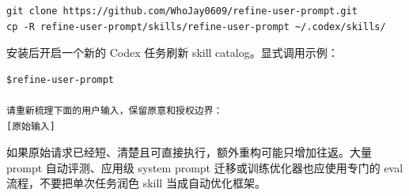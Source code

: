 \documentclass[UTF8,a4paper,11pt,fontset=none]{ctexart}
\begin{document}
\begin{lstlisting}
git clone https://github.com/WhoJay0609/refine-user-prompt.git
cp -R refine-user-prompt/skills/refine-user-prompt ~/.codex/skills/
\end{lstlisting}

安装后开启一个新的 Codex 任务刷新 skill catalog。显式调用示例：

\begin{lstlisting}
$refine-user-prompt

请重新梳理下面的用户输入，保留原意和授权边界：
[原始输入]
\end{lstlisting}

如果原始请求已经短、清楚且可直接执行，额外重构可能只增加往返。大量 prompt 自动评测、应用级 system prompt 迁移或训练优化器也应使用专门的 eval 流程，不要把单次任务润色 skill 当成自动优化框架。
\end{document}

